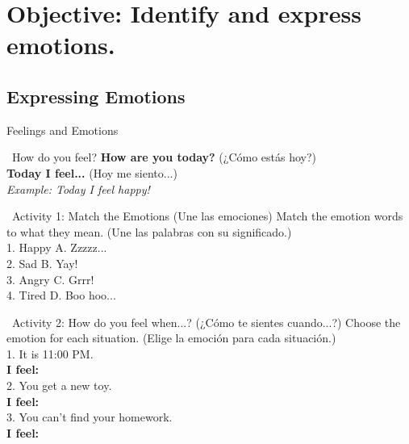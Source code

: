 \section*{Objective: Identify and express emotions.}

\subsection*{Expressing Emotions}

\begin{vocabcard}{Feelings and Emotions}
\end{vocabcard}

\begin{grammartip}{ \ How do you feel?}
  \textbf{How are you today?} (¿Cómo estás hoy?)\\
  \textbf{Today I feel...} (Hoy me siento...)\\[1em]
  \emph{Example: Today I feel happy!}
\end{grammartip}

\begin{activity}{ \ Activity 1: Match the Emotions (Une las emociones)}
  Match the emotion words to what they mean. (Une las palabras con su significado.)\\
  1. Happy \qquad A. Zzzzz...\\
  2. Sad \qquad B. Yay!\\
  3. Angry \qquad C. Grrr!\\
  4. Tired \qquad D. Boo hoo...
  \writinglines[4]
\end{activity}

\begin{activity}{ \ Activity 2: How do you feel when...? (¿Cómo te sientes cuando...?)}
  Choose the emotion for each situation. (Elige la emoción para cada situación.)\\[1em]
  1. It is 11:00 PM.\\
  \textbf{I feel:} \answerline[4cm]\\[1em]
  2. You get a new toy.\\
  \textbf{I feel:} \answerline[4cm]\\[1em]
  3. You can't find your homework.\\
  \textbf{I feel:} \answerline[4cm]
\end{activity}

